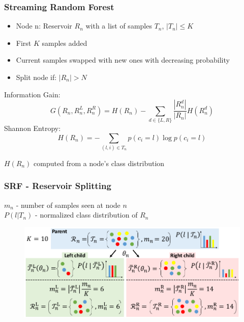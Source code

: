 \documentclass[mathserif, 10pt]{beamer}
\begin{document}
\begin{frame}
\frametitle{Streaming Random Forest}
  \begin{itemize}
   \item Node n: Reservoir $R_n$ with a list of samples $T_n$, $|T_n| \leq K$
   \item First $K$ samples added
   \item Current samples swapped with new ones with decreasing probability
   \item Split node if: $|R_n| > N$
  \end{itemize}

  Information Gain:
  \vspace{-0.25cm}
  \begin{equation} \label{eq:infogain}
    G(R_n, R_n^L, R_n^R) = H(R_n) - \sum_{d \in \{L, R\}} \frac{|R_n^d|}{|R_n|}H(R_n^d)
  \end{equation}
  Shannon Entropy:
  \vspace{-0.25cm}
  \begin{equation}
   H(R_n) = - \sum_{(l, i) \in T_n} p(c_i = l) \log{p(c_i = l)}
  \end{equation}
  
  \vspace{-0.25cm}
  $H(R_n)$ computed from a node's class distribution
  
\end{frame}

\begin{frame}
\frametitle{SRF - Reservoir Splitting}
$m_n$ - number of samples seen at node $n$\\
$P(l | T_n)$ - normalized class distribution of $R_n$
\vspace{-0.25cm}
\begin{figure}[!ht]
  \center
  \includegraphics[width=\textwidth]{figures/forest}
  \label{fig:forest}
\end{figure}

\end{frame}
\end{document}
